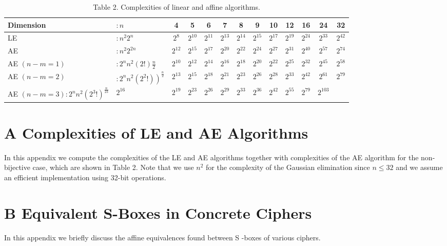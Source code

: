 \documentclass[10pt]{article}
\begin{document}
\begin{table}[h]
\begin{center}
\captionsetup{labelformat=empty}
\caption{Table 2. Complexities of linear and affine algorithms.}
\begin{tabular}{llccccccccccc}
\hline
Dimension & $: n$ & 4 & 5 & 6 & 7 & 8 & 9 & 10 & 12 & 16 & 24 & 32 \\
\hline
LE & $: n^{2} 2^{n}$ & $2^{8}$ & $2^{10}$ & $2^{11}$ & $2^{13}$ & $2^{14}$ & $2^{15}$ & $2^{17}$ & $2^{19}$ & $2^{24}$ & $2^{33}$ & $2^{42}$ \\
AE & $: n^{2} 2^{2 n}$ & $2^{12}$ & $2^{15}$ & $2^{17}$ & $2^{20}$ & $2^{22}$ & $2^{24}$ & $2^{27}$ & $2^{31}$ & $2^{40}$ & $2^{57}$ & $2^{74}$ \\
AE $(n-m=1)$ & $: 2^{n} n^{2}(2!) \frac{n}{2}$ & $2^{10}$ & $2^{12}$ & $2^{14}$ & $2^{16}$ & $2^{18}$ & $2^{20}$ & $2^{22}$ & $2^{25}$ & $2^{32}$ & $2^{45}$ & $2^{58}$ \\
AE $(n-m=2)$ & $\left.: 2^{n} n^{2}\left(2^{2}!\right)\right)^{\frac{n}{2}}$ & $2^{13}$ & $2^{15}$ & $2^{18}$ & $2^{21}$ & $2^{23}$ & $2^{26}$ & $2^{28}$ & $2^{33}$ & $2^{42}$ & $2^{61}$ & $2^{79}$ \\
AE $(n-m=3): 2^{n} n^{2}\left(2^{3}!\right)^{\frac{n}{23}}$ & $2^{16}$ & $2^{19}$ & $2^{23}$ & $2^{26}$ & $2^{29}$ & $2^{33}$ & $2^{36}$ & $2^{42}$ & $2^{55}$ & $2^{79}$ & $2^{103}$ &  \\
\hline
\end{tabular}
\end{center}
\end{table}

\section*{A Complexities of LE and AE Algorithms}
In this appendix we compute the complexities of the LE and AE algorithms together with complexities of the AE algorithm for the non-bijective case, which are shown in Table 2. Note that we use $n^{2}$ for the complexity of the Gaussian elimination since $n \leq 32$ and we assume an efficient implementation using 32-bit operations.

\section*{B Equivalent S-Boxes in Concrete Ciphers}
In this appendix we briefly discuss the affine equivalences found between S -boxes of various ciphers.
\end{document}
